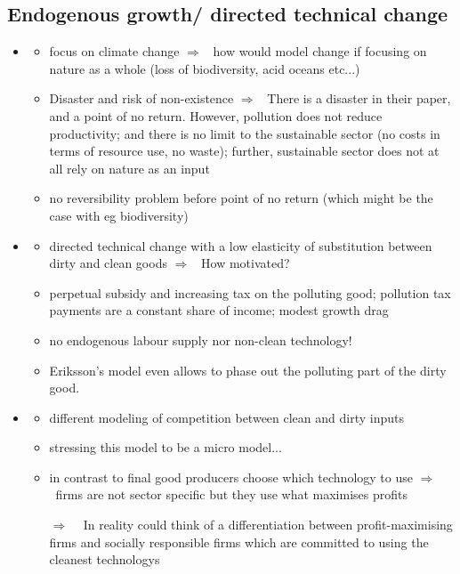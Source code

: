 \documentclass[12pt]{article}
\newcommand{\ar}{$\Rightarrow$ \ }
\begin{document}
\subsection{Endogenous growth/ directed technical change}
\begin{itemize}
	\item \cite{Acemoglu2012TheChange}
	\begin{itemize}
		\item focus on climate change \ar how would model change if focusing on nature as a whole (loss of biodiversity, acid oceans etc...)
\item 	Disaster and risk of non-existence \ar There is a disaster in their paper, and a point of no return. However, pollution does not reduce productivity; and there is no limit to the sustainable sector (no costs in terms of resource use, no waste); further, sustainable sector does not at all rely on nature as an input
\item no reversibility problem before point of no return (which might be the case with eg biodiversity)
	\end{itemize}	
	\item \cite{Eriksson2018PhasingChange}
	\begin{itemize}
\item directed technical change with  a low elasticity of substitution between dirty and clean goods \ar How motivated?
\item perpetual subsidy and increasing tax on the polluting good; pollution tax payments are a constant share of income; modest growth drag
\item no endogenous labour supply nor non-clean technology!
\item Eriksson's model even allows to phase out the polluting part of the dirty good. 
	\end{itemize}
\item \cite{Acemoglu2016TransitionTechnology}
\begin{itemize}
\item different modeling of competition between clean and dirty inputs
\item stressing this model to be a micro model...
\item in contrast to \cite{Acemoglu2012TheChange} final good producers choose which technology to use \ar firms are not sector specific but they use what maximises profits 
\item[\ar] In reality could think of a differentiation between profit-maximising firms and socially responsible firms which are committed to using the cleanest technologys

\end{itemize}
\end{itemize}
\end{document}
